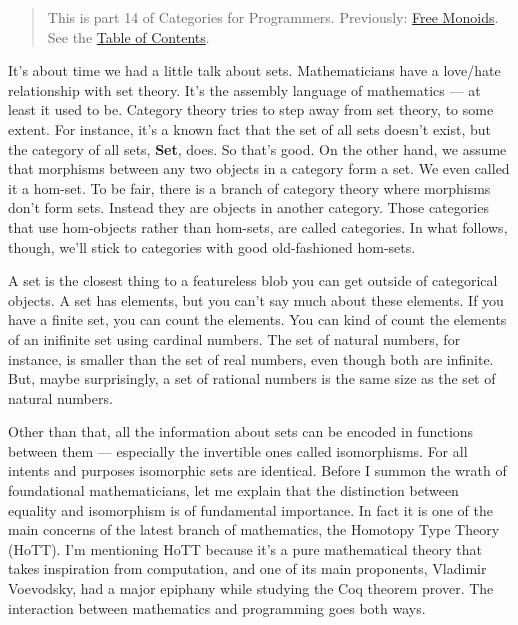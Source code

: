 \begin{quote}
This is part 14 of Categories for Programmers. Previously:
\href{https://bartoszmilewski.com/2015/07/21/free-monoids/}{Free
Monoids}. See the
\href{https://bartoszmilewski.com/2014/10/28/category-theory-for-programmers-the-preface/}{Table
of Contents}.
\end{quote}

It's about time we had a little talk about sets. Mathematicians have a
love/hate relationship with set theory. It's the assembly language of
mathematics --- at least it used to be. Category theory tries to step
away from set theory, to some extent. For instance, it's a known fact
that the set of all sets doesn't exist, but the category of all sets,
\textbf{Set}, does. So that's good. On the other hand, we assume that
morphisms between any two objects in a category form a set. We even
called it a hom-set. To be fair, there is a branch of category theory
where morphisms don't form sets. Instead they are objects in another
category. Those categories that use hom-objects rather than hom-sets,
are called  categories. In what follows, though, we'll
stick to categories with good old-fashioned hom-sets.

A set is the closest thing to a featureless blob you can get outside of
categorical objects. A set has elements, but you can't say much about
these elements. If you have a finite set, you can count the elements.
You can kind of count the elements of an inifinite set using cardinal
numbers. The set of natural numbers, for instance, is smaller than the
set of real numbers, even though both are infinite. But, maybe
surprisingly, a set of rational numbers is the same size as the set of
natural numbers.

Other than that, all the information about sets can be encoded in
functions between them --- especially the invertible ones called
isomorphisms. For all intents and purposes isomorphic sets are
identical. Before I summon the wrath of foundational mathematicians, let
me explain that the distinction between equality and isomorphism is of
fundamental importance. In fact it is one of the main concerns of the
latest branch of mathematics, the Homotopy Type Theory (HoTT). I'm
mentioning HoTT because it's a pure mathematical theory that takes
inspiration from computation, and one of its main proponents, Vladimir
Voevodsky, had a major epiphany while studying the Coq theorem prover.
The interaction between mathematics and programming goes both ways.

